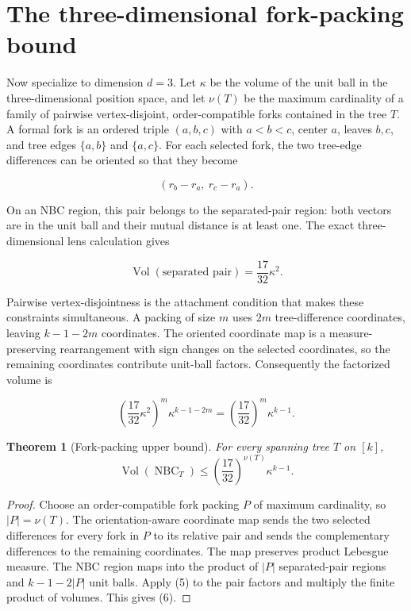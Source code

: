 \documentclass[11pt]{article}
\newtheorem{theorem}{Theorem}
\newcommand{\NBC}{\operatorname{NBC}}
\newcommand{\Vol}{\operatorname{Vol}}
\newcommand{\1}{\mathbf{1}}
\begin{document}
\section{The three-dimensional fork-packing bound}

Now specialize to dimension $d=3$.  Let $\kappa$ be the volume of the unit
ball in the three-dimensional position space, and let $\nu(T)$ be the maximum
cardinality of a family of pairwise vertex-disjoint, order-compatible forks
contained in the tree $T$.  A formal fork is an ordered triple $(a,b,c)$ with
$a<b<c$, center $a$, leaves $b,c$, and tree edges $\{a,b\}$ and $\{a,c\}$.
For each selected fork,
the two tree-edge differences can be oriented so that they become

\[
 (r_b-r_a,\ r_c-r_a).
\]

On an NBC region, this pair belongs to the separated-pair region: both vectors
are in the unit ball and their mutual distance is at least one.  The exact
three-dimensional lens calculation gives

\[
 \Vol(\text{separated pair})=\frac{17}{32}\kappa^2.
\tag{5}
\]

Pairwise vertex-disjointness is the attachment condition that makes these
constraints simultaneous.  A packing of size $m$ uses $2m$ tree-difference
coordinates, leaving $k-1-2m$ coordinates.  The oriented coordinate map is a
measure-preserving rearrangement with sign changes on the selected coordinates,
so the remaining coordinates contribute unit-ball factors.  Consequently the
factorized volume is

\[
 \left(\frac{17}{32}\kappa^2\right)^m
   \kappa^{k-1-2m}
 =\left(\frac{17}{32}\right)^m\kappa^{k-1}.
\]

\begin{theorem}[Fork-packing upper bound]
For every spanning tree $T$ on $[k]$,
\[
 \Vol(\NBC_T)\le
 \left(\frac{17}{32}\right)^{\nu(T)}\kappa^{k-1}.
\tag{6}
\]
\end{theorem}

\begin{proof}
Choose an order-compatible fork packing $P$ of maximum cardinality, so
$|P|=\nu(T)$.  The
orientation-aware coordinate map sends the two selected differences for every
fork in $P$ to its relative pair and sends the complementary differences to
the remaining coordinates.  The map preserves product Lebesgue measure.  The
NBC region maps into the product of $|P|$ separated-pair regions and
$k-1-2|P|$ unit balls.  Apply (5) to the pair factors and multiply the
finite product of volumes.  This gives (6).
\end{proof}
\end{document}
